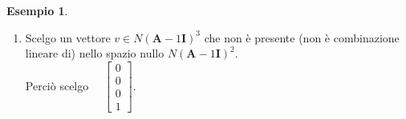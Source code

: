 \documentclass[a4paper]{article}
\renewcommand{\vec}{\bm}
\theoremstyle{definition}
\newtheorem{exmp}{Esempio}[section]
\begin{document}
\begin{exmp}
\begin{enumerate}
\[\begin{bmatrix}
						\end{bmatrix},
						\begin{bmatrix}
							0 \\ 0 \\ 1 \\ 0
						\end{bmatrix},
						\begin{bmatrix}
							0 \\ 0 \\ 0 \\ 1
						\end{bmatrix}
						\right\}
					\]
					posso quindi fermarmi dato che $\ \text{dim}(N) = \mu_a $.
					\item Scelgo un vettore $ v \in N(\vec{A} - 1\vec{I})^3 $ che non è presente (non è combinazione lineare di) nello spazio nullo $ N(\vec{A} - 1\vec{I})^2  $. \\Perciò scelgo $\quad  \begin{bmatrix}
					0 \\ 0 \\ 0 \\ 1
					\end{bmatrix} $.
					

\end{enumerate}
\end{exmp}
\end{document}
